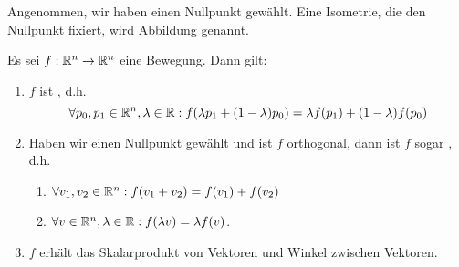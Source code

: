 \begin{definition}
Angenommen, wir haben einen Nullpunkt gewählt. Eine Isometrie, die den Nullpunkt fixiert, wird  Abbildung genannt.
\end{definition}

\begin{theorem}
Es sei $f:\mathbb{R}^n\to\mathbb{R}^n$ eine Bewegung. Dann gilt:
\begin{enumerate}
\item $f$ ist , d.h.
\[\forall p_0,p_1\in\mathbb{R}^n, \lambda\in\mathbb{R}: f(\lambda p_1 + (1-\lambda)p_0) = \lambda f(p_1)+(1-\lambda)f(p_0)\]
\item Haben wir einen Nullpunkt gewählt und ist $f$ orthogonal, dann ist $f$ sogar , d.h.
\begin{enumerate}
\item $\forall v_1,v_2\in\mathbb{R}^n: f(v_1+v_2)=f(v_1)+f(v_2)$
\item $\forall v\in\mathbb{R}^n, \lambda\in\mathbb{R}: f(\lambda v)=\lambda f(v)$.
\end{enumerate}
\item $f$ erhält das Skalarprodukt von Vektoren und Winkel zwischen Vektoren.
\end{enumerate}
\end{theorem}
